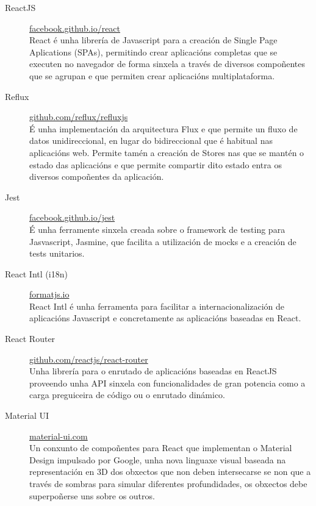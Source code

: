   \begin{description}
   \item [ReactJS] 
\href{https://facebook.github.io/react/}{facebook.github.io/react} \\ React é 
unha librería de Javascript para a 
creación de Single Page Aplications (SPAs), permitindo crear aplicacións 
completas que se executen no navegador de forma sinxela a través de diversos 
compoñentes que se agrupan e que permiten crear aplicacións multiplataforma.

   \item [Reflux] \href{https://github.com/reflux/refluxjs}{
github.com/reflux/refluxjs}\\ É unha implementación da 
arquitectura Flux e que permite un fluxo de datos unidireccional, en lugar do 
bidireccional que é habitual nas aplicacións web.
    Permite tamén a creación de Stores nas que se mantén o estado das aplicacións e que 
permite compartir dito estado entra os diversos compoñentes da aplicación.

   \item [Jest] 
\href{https://facebook.github.io/jest/}{facebook.github.io/jest}\\ É unha 
ferramente sinxela creada sobre o 
framework de testing para Jasvascript, Jasmine, que facilita a utilización de 
mocks e a creación de tests unitarios.

   \item [React Intl (i18n)]\href{http://formatjs.io/}{formatjs.io}\\ React 
Intl é unha 
ferramenta para facilitar a internacionalización de aplicacións Javascript e 
concretamente as 
aplicacións baseadas en React.

   \item [React 
Router]\href{https://github.com/reactjs/react-router}{
github.com/reactjs/react-router}\\ Unha 
librería para o enrutado de aplicacións baseadas en ReactJS 
proveendo unha API sinxela con funcionalidades de gran potencia como a carga preguiceira 
de código ou o enrutado dinámico.

   \item [Material UI] 
\href{http://www.material-ui.com/}{material-ui.com}\\ Un conxunto de 
compoñentes para React que implementan o Material 
Design impulsado por Google, unha nova linguaxe visual baseada na representación en 3D 
dos obxectos que non deben intersecarse se non que a través de sombras para simular 
diferentes profundidades, os obxectos debe superpoñerse uns sobre os outros.

  \end{description}

